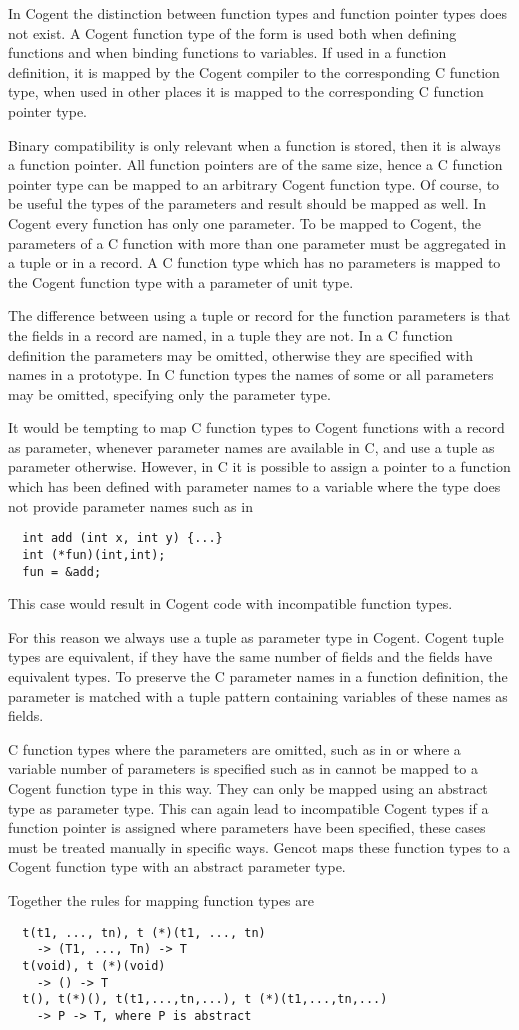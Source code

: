 In Cogent the distinction between function types and function pointer types does not exist. 
A Cogent function type of the form  is used both when
defining functions and when binding functions to variables. If used in a function definition, it is mapped by
the Cogent compiler to the corresponding C function type, when used in other places it is mapped to the 
corresponding C function pointer type.

Binary compatibility is only relevant when a function is stored, then it is always a function pointer. All function
pointers are of the same size, hence a C function pointer type can be mapped to an arbitrary Cogent function type.
Of course, to be useful the types of the parameters and result should be mapped as well. In Cogent every function
has only one parameter. To be mapped to Cogent, the parameters of a C function with more than one parameter must
be aggregated in a tuple or in a record. A C function type  which has no parameters is mapped
to the Cogent function type  with a parameter of unit type.

The difference between using a tuple or record for the function parameters is that the fields in a 
record are named, in a tuple they are not. In 
a C function definition the parameters may be omitted, otherwise they are specified with names in a prototype.
In C function types the names of some or all parameters may be omitted, specifying only the parameter type.

It would be tempting to map C function types to Cogent functions with a record as parameter, whenever parameter 
names are available in C, and use a tuple as parameter otherwise. However, in C it is possible to assign a 
pointer to a function which has been defined 
with parameter names to a variable where the type does not provide parameter names such as in 
\begin{verbatim}
  int add (int x, int y) {...}
  int (*fun)(int,int);
  fun = &add;
\end{verbatim}
This case would result in Cogent code with incompatible function types.

For this reason we always use a tuple as parameter type in Cogent. Cogent tuple types are equivalent, if they
have the same number of fields and the fields have equivalent types. To preserve the C parameter names in 
a function definition, the parameter is matched with a tuple pattern containing variables of these
names as fields.

C function types where the parameters are omitted, such as in  or where a variable number of
parameters is specified such as in  cannot be mapped to a Cogent function type in this way. 
They can only be mapped using an abstract type as parameter type. This can again lead to incompatible 
Cogent types if a function pointer is assigned where parameters have been specified, these cases must 
be treated manually in specific ways. Gencot maps these function types to a Cogent function type with an abstract
parameter type.

Together the rules for mapping function types are
\begin{verbatim}
  t(t1, ..., tn), t (*)(t1, ..., tn) 
    -> (T1, ..., Tn) -> T
  t(void), t (*)(void) 
    -> () -> T
  t(), t(*)(), t(t1,...,tn,...), t (*)(t1,...,tn,...) 
    -> P -> T, where P is abstract
\end{verbatim}

 
